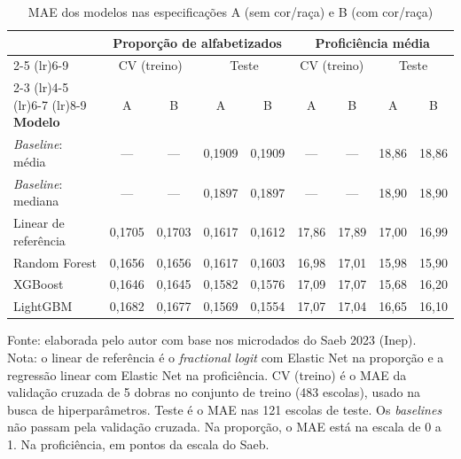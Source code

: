 \begin{apendicesenv}
\begin{table}[H]
    \centering
    \footnotesize
    \caption{MAE dos modelos nas especificações A (sem cor/raça) e B (com cor/raça)}
    \label{tab:ap-cor-raca-erro}
    \begin{tabular}{lcccccccc}
        \toprule
        & \multicolumn{4}{c}{\textbf{Proporção de alfabetizados}} & \multicolumn{4}{c}{\textbf{Proficiência média}} \\
        \cmidrule(lr){2-5} \cmidrule(lr){6-9}
        & \multicolumn{2}{c}{CV (treino)} & \multicolumn{2}{c}{Teste} & \multicolumn{2}{c}{CV (treino)} & \multicolumn{2}{c}{Teste} \\
        \cmidrule(lr){2-3} \cmidrule(lr){4-5} \cmidrule(lr){6-7} \cmidrule(lr){8-9}
        \textbf{Modelo} & A & B & A & B & A & B & A & B \\
        \midrule
        \textit{Baseline}: média & --- & --- & 0,1909 & 0,1909 & --- & --- & 18,86 & 18,86 \\
        \textit{Baseline}: mediana & --- & --- & 0,1897 & 0,1897 & --- & --- & 18,90 & 18,90 \\
        Linear de referência & 0,1705 & 0,1703 & 0,1617 & 0,1612 & 17,86 & 17,89 & 17,00 & 16,99 \\
        Random Forest & 0,1656 & 0,1656 & 0,1617 & 0,1603 & 16,98 & 17,01 & 15,98 & 15,90 \\
        XGBoost & 0,1646 & 0,1645 & 0,1582 & 0,1576 & 17,09 & 17,07 & 15,68 & 16,20 \\
        LightGBM & 0,1682 & 0,1677 & 0,1569 & 0,1554 & 17,07 & 17,04 & 16,65 & 16,10 \\
        \bottomrule
    \end{tabular}
    \vspace{0.1cm}
    \begin{flushleft}
    {\footnotesize Fonte: elaborada pelo autor com base nos microdados do Saeb 2023 (Inep).\\
    Nota: o linear de referência é o \textit{fractional logit} com Elastic Net na proporção e a regressão linear
    com Elastic Net na proficiência. CV (treino) é o MAE da validação cruzada de 5 dobras no conjunto de treino (483 escolas), usado na
    busca de hiperparâmetros. Teste é o MAE nas 121 escolas de teste. Os \textit{baselines} não passam pela
    validação cruzada. Na proporção, o MAE está na escala de 0 a 1. Na proficiência, em pontos da escala do Saeb.}
    \end{flushleft}
\end{table}


\end{apendicesenv}
